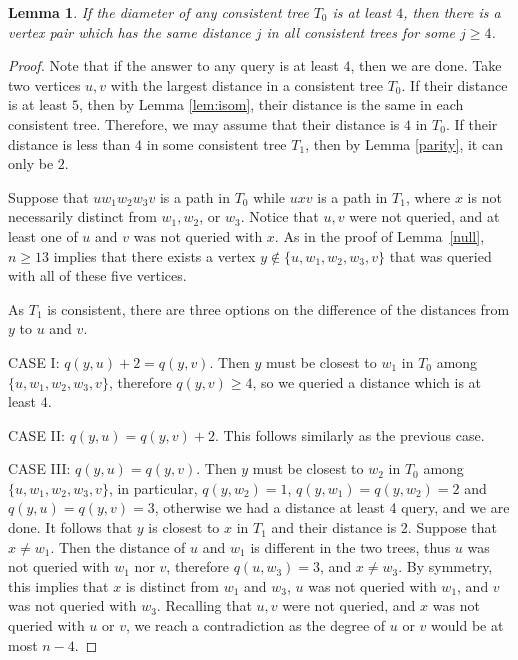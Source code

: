 \documentclass[12pt,a4paper]{amsart}
\theoremstyle{plain}
\newtheorem{lemma}[theorem]{Lemma}
\theoremstyle{definition}
\begin{document}
\begin{lemma}\label{lem:diam4}
    If the diameter of any consistent tree $T_0$ is at least $4$, then there is a vertex pair which has the same distance $j$ in all consistent trees for some $j \geq 4$.
\end{lemma}
\begin{proof} Note that if the answer to any query is at least $4$, then we are done. 
Take two vertices $u,v$ with the largest distance in a consistent tree $T_0$. If their distance is at least $5$, then by Lemma \ref{lem:isom}, their distance is the same in each consistent tree. Therefore, we may assume that their distance is $4$ in $T_0$. If their distance is less than $4$ in some consistent tree $T_1$, then by Lemma \ref{parity}, it can only be $2$.

Suppose that $uw_1w_2w_3v$ is a path in $T_0$ while $uxv$ is a path in $T_1$, where $x$ is not necessarily distinct from $w_1, w_2$, or $w_3$. Notice that $u,v$ were not queried, and at least one of $u$ and $v$ was not queried with $x$. As in the proof of Lemma~\ref{null}, $n \geq 13$ implies that there exists a vertex $y \notin\{u,w_1,w_2,w_3,v\}$ that was queried with all of these five vertices.

As $T_1$ is consistent, there are three options on the  difference of the distances from $y$ to $u$ and $v$.


CASE I: $q(y,u)+2=q(y,v)$. Then $y$ must be closest to $w_1$ in $T_0$ among $\{u,w_1,w_2,w_3,v\}$, therefore $q(y,v) \geq 4$, so we queried a distance which is at least $4$.

CASE II: $q(y,u)=q(y,v)+2$. This follows similarly as the previous case.

CASE III: 
$q(y,u)=q(y,v)$. Then $y$ must be closest to $w_2$ in $T_0$ among $\{u,w_1,w_2,w_3,v\}$, in particular, $q(y,w_2)=1$, $q(y,w_1)=q(y,w_2)=2$ and $q(y,u)=q(y,v)=3$, otherwise we had a distance at least 4 query, and we are done. It follows that $y$ is closest to $x$ in $T_1$ and their distance is 2. Suppose that $x\neq w_1$. Then the distance of $u$ and $w_1$ is different in the two trees, thus $u$ was not queried with $w_1$ nor $v$, therefore $q(u,w_3)=3$, and $x \neq w_3$. By symmetry, this implies that $x$ is distinct from $w_1$ and $w_3$, $u$ was not queried with $w_1$, and $v$ was not queried with $w_3$. Recalling that $u,v$ were not queried, and $x$ was not queried with $u$ or $v$, we reach a contradiction as the degree of $u$ or $v$ would be at most $n-4$.    
\end{proof}
\end{document}
